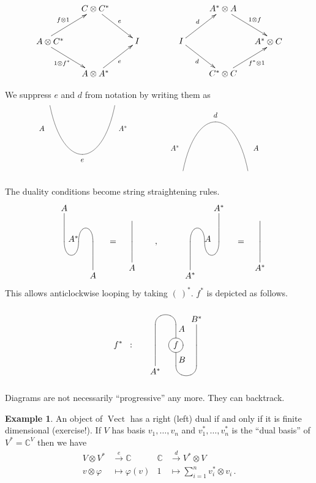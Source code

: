 \documentclass[a4paper,12pt]{article}
\theoremstyle{definition}
\newtheorem*{Example}{Example}%
\theoremstyle{fact}
\theoremstyle{genquest}
\theoremstyle{step}
\newcommand{\CC}{\mathbb{C}}
\newcommand{\Vect}{\operatorname{Vect}}
\newcommand{\longto}{\longrightarrow}
\begin{document}
\[
\xymatrix{  & C\otimes C^\ast \ar[rd]^{e} \\
*+!L(.5){A \otimes C^\ast}\ar[ru]^{f\otimes 1} \ar[rd]_{1\otimes f^\ast} & & I \\
 & A\otimes A^\ast   \ar[ru]_{e} }  
\qquad\qquad
\xymatrix{  & A^\ast \otimes A \ar[rd]^-{1\otimes f} \\
I \ar[ru]^-{d} \ar[rd]_-{d} & & *+!R(.5){A^\ast \otimes C} \\
 & C^\ast \otimes C   \ar[ru]_-{f^\ast \otimes 1} }
 \]

\medskip\noindent
We suppress $e$ and $d$ from notation by writing them as
%
\[ \kern-1cm
\xygraph{!{0;(-2.5,0):(0,1)::} [dd]*{}="l" [r] *{}="r" 
 "l"-@`{"l"+(.2,1),"r"+(-.2,1)}"r"|*++!U{e} 
"l" [l(.125)u(.35)] {A^*} "r" [r(.125)u(.35)] {A} 
}
\kern-3cm
\xygraph{!{0;(2.5,0):(0,1)::} [d] *{}="l" [r] *{}="r"
 "l"-@`{"l"+(.2,1),"r"+(-.2,1)}"r" |*++!D{d}
"l" [l(.125)u(.35)] {A^*} "r" [r(.125)u(.35)] {A}  
} 
\]

\noindent 
The duality conditions become string straightening rules.
\[
\xygraph{ !{/r1.4pc/: /u2.75pc/::}
 []*+!D{A}
!{\xcapv-@(0)}
!{\vcap[-]}
[r] (?*!DR{A^*} , !{\vcap} )
[r] !{\xcapv-@(0)} *+!U{A}
} \quad = 
\xygraph{
!{/r1.3pc/: /u2pc/::}
!{\xcapv-@(0)}
!{\xcapv-@(0)} *+!U{A}
} \qquad,\qquad
\xygraph{ !{/r1.4pc/: /u2.75pc/::}
 [rr]*+!D{A^*}
  !{\xcapv-@(0)}
 [l] !{\vcap[-]}
 (?*!DL{A} ,  [l] !{\vcap} )
 [l] !{\xcapv-@(0)} *+!U{A^*}
} \quad = 
\xygraph{
!{/r1.3pc/: /u2pc/::}
!{\xcapv-@(0)}
!{\xcapv-@(0)} *+!U{A^*}
} \]
%
This allows anticlockwise looping by taking $( \ )^\ast$.
$f^\ast$ is depicted as follows. 
\[ 
f^* \;\; : 
\xygraph{ !{/r2pc/: /u2pc/::}
 [rr]*+!D{B^*}
  !{\xcapv-@(0)} !{\xcapv-@(0)}
 [l] !{\vcap[-]} - [u]*+<8pt>[Fo]{f} _(.3)*{B}
 ( ?-[u]_(.8)*{A} [l] !{\vcap} )
 [lu] !{\xcapv-@(0)\xcapv-@(0)} *+!U{A^*}
} \]
%
Diagrams are not necessarily ``progressive''  any more.   They can backtrack.

\begin{Example}
An object of $\Vect $ has a right (left) dual if and only if it is finite dimensional (exercise!). 
If $V$ has basis $v_1,\ldots,v_n$ and $v^\ast_1,\ldots,v^\ast_n$ is the ``dual basis'' of $V^\ast = \CC^V$ then we have
%
\begin{align*}
 V \otimes V^\ast &\stackrel{e}{\longto} \CC    
   & \CC  &\stackrel{d}{\longto}   V^\ast \otimes V  \\
  v \otimes \varphi &\longmapsto \varphi (v)   
   & 1 &\longmapsto \sum^n_{i=1} v^\ast_i \otimes v_i\,.
\end{align*}
\end{Example}
\end{document}
